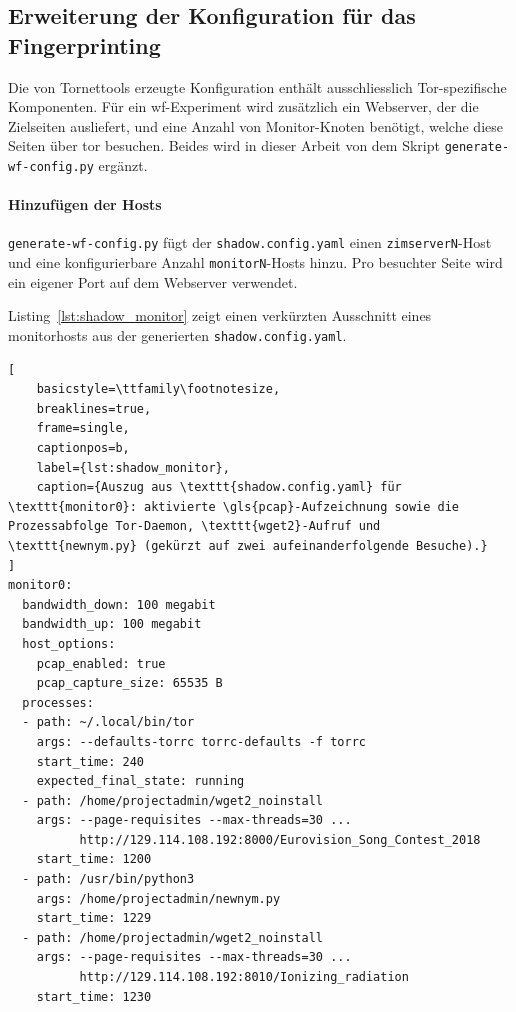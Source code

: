 \subsection{Erweiterung der Konfiguration für das Fingerprinting}
\label{sec:realisierung_generate_wf_config}

Die von Tornettools erzeugte Konfiguration enthält ausschliesslich Tor-spezifische Komponenten.
Für ein \gls{wf}-Experiment wird zusätzlich ein Webserver, der die Zielseiten ausliefert, und eine Anzahl von Monitor-Knoten benötigt, welche diese Seiten über \gls{tor} besuchen.
Beides wird in dieser Arbeit von dem Skript \texttt{generate-wf-config.py} ergänzt.

\paragraph{Hinzufügen der Hosts}
\texttt{generate-wf-config.py} fügt der \texttt{shadow.config.yaml} einen \texttt{zimserverN}-Host und eine konfigurierbare Anzahl \texttt{monitorN}-Hosts hinzu.
Pro besuchter Seite wird ein eigener Port auf dem Webserver verwendet.

Listing~\ref{lst:shadow_monitor} zeigt einen verkürzten Ausschnitt eines \gls{monitorhost}s aus der generierten \texttt{shadow.config.yaml}.

\noindent\begin{minipage}{\linewidth}
\begin{lstlisting}[
    basicstyle=\ttfamily\footnotesize,
    breaklines=true,
    frame=single,
    captionpos=b,
    label={lst:shadow_monitor},
    caption={Auszug aus \texttt{shadow.config.yaml} für \texttt{monitor0}: aktivierte \gls{pcap}-Aufzeichnung sowie die Prozessabfolge Tor-Daemon, \texttt{wget2}-Aufruf und \texttt{newnym.py} (gekürzt auf zwei aufeinanderfolgende Besuche).}
]
monitor0:
  bandwidth_down: 100 megabit
  bandwidth_up: 100 megabit
  host_options:
    pcap_enabled: true
    pcap_capture_size: 65535 B
  processes:
  - path: ~/.local/bin/tor
    args: --defaults-torrc torrc-defaults -f torrc
    start_time: 240
    expected_final_state: running
  - path: /home/projectadmin/wget2_noinstall
    args: --page-requisites --max-threads=30 ...
          http://129.114.108.192:8000/Eurovision_Song_Contest_2018
    start_time: 1200
  - path: /usr/bin/python3
    args: /home/projectadmin/newnym.py
    start_time: 1229
  - path: /home/projectadmin/wget2_noinstall
    args: --page-requisites --max-threads=30 ...
          http://129.114.108.192:8010/Ionizing_radiation
    start_time: 1230
\end{lstlisting}
\end{minipage}

